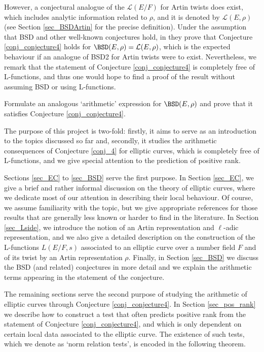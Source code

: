 However, a conjectural analogue of the $\mathcal{L}(E/F)$ for Artin twists does exist, which includes analytic information related to $\rho$, and it is denoted by $\mathcal{L}(E,\rho)$ (see Section \ref{sec_BSDArtin} for the precise definition). Under the assumption that BSD and other well-known conjectures hold, in \cite[\S2, Theorem 5]{DEW1} they prove that Conjecture \ref{conj_conjecture4} holds for $\BSD(E,\rho)=\mathcal{L}(E,\rho)$, which is the expected behaviour if an analogue of BSD2 for Artin twists were to exist. Nevertheless, we remark that the statement of Conjecture \ref{conj_conjecture4} is completely free of L-functions, and thus one would hope to find a proof of the result without assuming BSD or using L-functions.

\begin{problem}
    Formulate an analogous `arithmetic' expression for $\BSD(E,\rho)$ and prove that it satisfies Conjecture \ref{conj_conjecture4}.
\end{problem}

The purpose of this project is two-fold: firstly, it aims to serve as an introduction to the topics discussed so far and, secondly, it studies the arithmetic consequences of Conjecture \ref{conj_4} for elliptic curves, which is completely free of L-functions, and we give special attention to the prediction of positive rank.

Sections \ref{sec_EC} to \ref{sec_BSD} serve the first purpose. In Section \ref{sec_EC}, we give a brief and rather informal discussion on the theory of elliptic curves, where we dedicate most of our attention in describing their local behaviour. Of course, we assume familiarity with the topic, but we give appropriate references for those results that are generally less known or harder to find in the literature. In Section \ref{sec_Lside}, we introduce the notion of an Artin representation and $\ell$-adic representation, and we also give a detailed description on the construction of the L-functions $L(E/F,s)$ associated to an elliptic curve over a number field $F$ and of its twist by an Artin representation $\rho$. Finally, in Section \ref{sec_BSD} we discuss the BSD (and related) conjectures in more detail and we explain the arithmetic terms appearing in the statement of the conjecture.

The remaining sections serve the second purpose of studying the arithmetic of elliptic curves through Conjecture \ref{conj_conjecture4}. In Section \ref{sec_pos_rank} we describe how to construct a test that often predicts positive rank from the statement of Conjecture \ref{conj_conjecture4}, and which is only dependent on certain local data associated to the elliptic curve. The existence of such tests, which we denote as `norm relation tests', is encoded in the following theorem.

